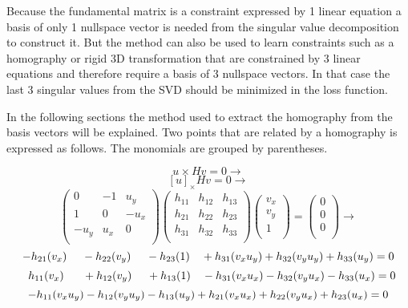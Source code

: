 Because the fundamental matrix is a constraint expressed by 1 linear equation a basis of only 1  nullspace vector is needed from the singular value decomposition to construct it. But the method can also be used to learn constraints such as a homography or rigid 3D transformation that are constrained by 3 linear equations and therefore require a basis of 3 nullspace vectors. In that case the last 3 singular values from the SVD should be minimized in the loss function.

In the following sections the method used to extract the homography from the basis vectors will be explained. Two points that are related by a homography is expressed as follows. The monomials are grouped by parentheses.

\[
u \times Hv=0 \rightarrow
\]
\[
[u]_{\times} Hv=0 \rightarrow
\]
\begin{equation}
\begin{pmatrix}
0 & -1 & u_y \\
1 & 0 & -u_x \\
-u_y & u_x & 0 \\
\end{pmatrix}
\begin{pmatrix}
h_{11} & h_{12} & h_{13} \\
h_{21} & h_{22} & h_{23} \\
h_{31} & h_{32} & h_{33} \\
\end{pmatrix}
\begin{pmatrix}
v_x \\
v_y \\
1 \\
\end{pmatrix}
=
\begin{pmatrix}
0 \\
0 \\
0 \\
\end{pmatrix}
\rightarrow
\end{equation}
\begin{equation}
-h_{21} (v_x) \ \ \ \ - h_{22} (v_y) \ \ \ \ - h_{23} (1) \ \ \ + h_{31} (v_x u_y) + h_{32} (v_y u_y) + h_{33} (u_y) = 0 \\
\label{eqn:H-1}
\end{equation}
\begin{equation}
\ \ h_{11} (v_x) \ \ \ \ \ + h_{12} (v_y) \ \ \ \ + h_{13} (1) \ \ \ -h_{31} (v_x u_x) -h_{32} (v_y u_x) - h_{33} (u_x) = 0 \\
\label{eqn:H-2}
\end{equation}
\begin{equation}
-h_{11} (v_x u_y) -h_{12} (v_y u_y) -h_{13} (u_y) + h_{21} (v_x u_x) + h_{22} (v_y u_x) + h_{23} (u_x) = 0 \\
\label{eqn:H-3}
\end{equation}

